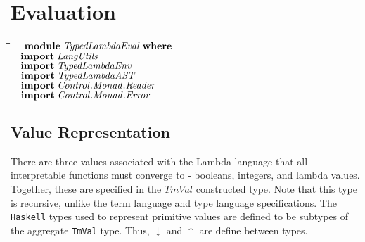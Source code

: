 \documentclass[10pt]{article}
\newlength{\lwidth}\setlength{\lwidth}{4.5cm}
\newlength{\cwidth}\setlength{\cwidth}{8mm} %
\newcommand{\Conid}[1]{\mathit{#1}}
\newcommand{\Varid}[1]{\mathit{#1}}
\begin{document}
\section{Evaluation}

\begin{tabbing}
\qquad\=\hspace{\lwidth}\=\hspace{\cwidth}\=\+\kill
${\hskip1.00em\relax\mathbf{module}\;\Conid{TypedLambdaEval}\;\mathbf{where}}$\\
${}$\\
${\hskip1.00em\relax\mathbf{import}\;\Conid{LangUtils}}$\\
${\hskip1.00em\relax\mathbf{import}\;\Conid{TypedLambdaEnv}}$\\
${\hskip1.00em\relax\mathbf{import}\;\Conid{TypedLambdaAST}}$\\
${\hskip1.00em\relax\mathbf{import}\;\Conid{\Conid{Control}.\Conid{Monad}.Reader}}$\\
${\hskip1.00em\relax\mathbf{import}\;\Conid{\Conid{Control}.\Conid{Monad}.Error}}$
\end{tabbing}  
\subsection{Value Representation}

There are three values associated with the Lambda language that all
interpretable functions must converge to - booleans, integers, and
lambda values.  Together, these are specified in the \ensuremath{\Conid{TmVal}}
constructed type.  Note that this type is recursive, unlike the term
language and type language specifications.  The \texttt{Haskell} types
used to represent primitive values are defined to be subtypes of the
aggregate \texttt{TmVal} type.  Thus, \ensuremath{\Varid{\downarrow}} and \ensuremath{\Varid{\uparrow}} are define
between types.
\end{document}

